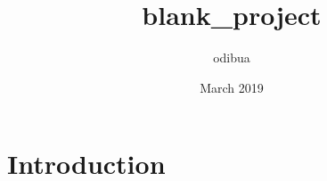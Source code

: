 \documentclass{article}
\title{blank_project}
\author{odibua }
\date{March 2019}
\begin{document}
\maketitle

\section{Introduction}
\end{document}
